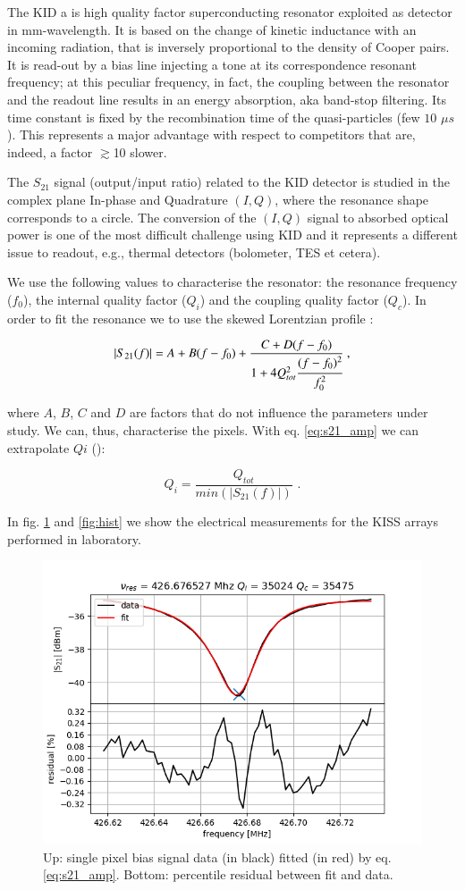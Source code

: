 \documentclass[twocolumn,traditabstract]{aa}\\
\begin{document}
The KID a is high quality factor superconducting resonator exploited as detector in mm-wavelength. It is based on the change of kinetic inductance with an incoming radiation, that is inversely proportional to the density of Cooper pairs. It is read-out by a bias line injecting a tone at its correspondence resonant frequency; at this peculiar frequency, in fact, the coupling between the resonator and the readout line results in an energy absorption, aka band-stop filtering. Its time constant is fixed by the recombination time of the quasi-particles (few $10$ $\mu s$). This represents a major advantage with respect to competitors that are, indeed, a factor $\gtrsim$10 slower.

The $S_{21}$ signal (output/input ratio) related to the KID detector is studied in the complex plane In-phase and Quadrature $(I,Q)$, where the resonance shape corresponds to a circle.
The conversion of the $(I,Q)$ signal to absorbed optical power is one of the most difficult challenge using KID and it represents a different issue to readout, e.g., thermal detectors (bolometer, TES et cetera).

We use the following  values to characterise the resonator: the resonance frequency ($f_0$), the internal quality factor ($Q_i$) and the coupling quality factor ($Q_c$). In order to fit the resonance we to use the skewed Lorentzian profile \cite{Gao}:

\begin{equation}
\left|S_{21}(f)\right|= A+B(f-f_0)+\frac{C+D(f-f_0)}{1+4Q_{tot}^2\cfrac{(f-f_0)^2}{f_0^2}} \text{ ,}
\label{eq:s21_amp}
\end{equation}

\noindent where $A$, $B$, $C$ and $D$ are factors that do not influence the parameters under study. We can, thus, characterise the pixels. With eq. \ref{eq:s21_amp} we can extrapolate $Qi$ (\cite{Gao}):

\begin{equation}
Q_i =\frac{Q_{tot}}{min(\left|S_{21}(f)\right|)}	\text{ .}
\end{equation} 

In fig. \ref{fig:fit_amp} and \ref{fig:hist} we show the electrical measurements for the KISS arrays performed in laboratory.

\begin{figure}[htf]
	\centering
	\includegraphics[width=.5\textwidth]{3.acqui/resonance_fit.png}
	\caption{Up: single pixel bias signal data (in black) fitted (in red) by eq. \ref{eq:s21_amp}. Bottom: percentile residual between fit and data.}
	\label{fig:fit_amp}
\end{figure}
\end{document}
